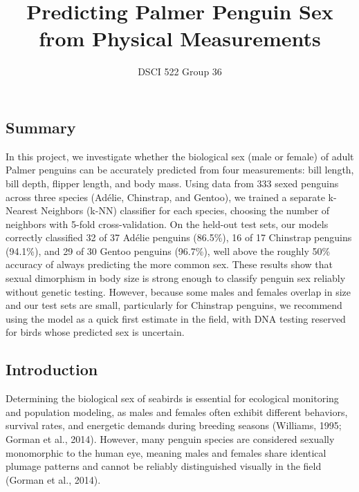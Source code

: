 \documentclass[
  letterpaper,
  DIV=11,
  numbers=noendperiod]{scrartcl}
\title{Predicting Palmer Penguin Sex from Physical Measurements}
\author{DSCI 522 Group 36}
\date{}
\renewcommand*\contentsname{Table of contents}
\newcommand\contentsname{Table of contents}
\begin{document}
\maketitle

\renewcommand*\contentsname{Table of contents}
{
\setcounter{tocdepth}{3}
\tableofcontents
}

\subsection{Summary}\label{summary}

In this project, we investigate whether the biological sex (male or
female) of adult Palmer penguins can be accurately predicted from four
measurements: bill length, bill depth, flipper length, and body mass.
Using data from 333 sexed penguins across three species (Adélie,
Chinstrap, and Gentoo), we trained a separate k-Nearest Neighbors (k-NN)
classifier for each species, choosing the number of neighbors with
5-fold cross-validation. On the held-out test sets, our models correctly
classified 32 of 37 Adélie penguins (86.5\%), 16 of 17 Chinstrap
penguins (94.1\%), and 29 of 30 Gentoo penguins (96.7\%), well above the
roughly 50\% accuracy of always predicting the more common sex. These
results show that sexual dimorphism in body size is strong enough to
classify penguin sex reliably without genetic testing. However, because
some males and females overlap in size and our test sets are small,
particularly for Chinstrap penguins, we recommend using the model as a
quick first estimate in the field, with DNA testing reserved for birds
whose predicted sex is uncertain.

\subsection{Introduction}\label{introduction}

Determining the biological sex of seabirds is essential for ecological
monitoring and population modeling, as males and females often exhibit
different behaviors, survival rates, and energetic demands during
breeding seasons (Williams, 1995; Gorman et al., 2014). However, many
penguin species are considered sexually monomorphic to the human eye,
meaning males and females share identical plumage patterns and cannot be
reliably distinguished visually in the field (Gorman et al., 2014).
\end{document}
